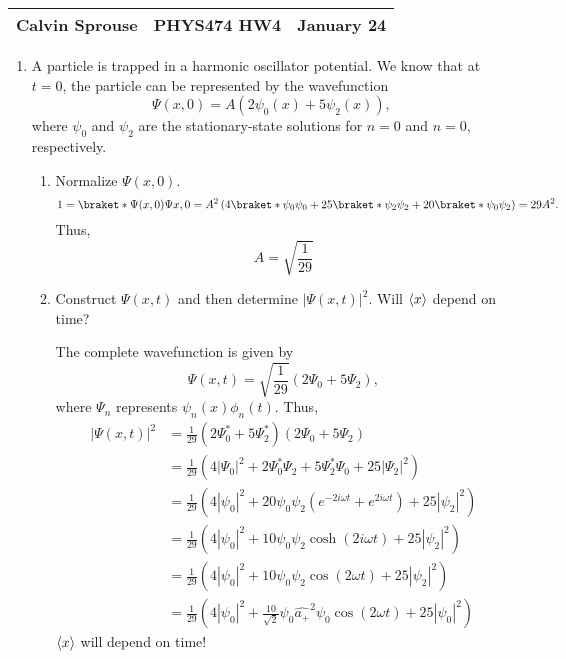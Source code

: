 \documentclass[a4paper, 12pt]{config/homework}
\begin{document}
\noindent
\begin{tabularx}{\textwidth}{>{\centering\arraybackslash}X>{\centering\arraybackslash}X>{\centering\arraybackslash}X}
Calvin Sprouse & PHYS474 HW4 & 2024 January 24\\
\midrule
\end{tabularx}

\begin{enumerate}
\item A particle is trapped in a harmonic oscillator potential. We know that at \(t=0\), the particle can be represented by the wavefunction
\[\Psi(x,0) = A\left(2\psi_0(x) + 5\psi_2(x)\right),\]
where \(\psi_0\) and \(\psi_2\) are the stationary-state solutions for \(n=0\) and \(n=0\), respectively.
\begin{enumerate}[label=(\alph*)]
\item Normalize \(\Psi(x,0)\).
\[1 = \braket*{\Psi(x,0)}{\Psi{x,0}}
= A^2 \left( 4 \braket*{\psi_0}{\psi_0} + 25 \braket*{\psi_2}{\psi_2} + 20\braket*{\psi_0}{\psi_2} \right)
= 29 A^2.\]
Thus,
\[A = \sqrt{\frac{1}{29}}\]

\item Construct \(\Psi(x,t)\) and then determine \(\left|\Psi(x,t)\right|^2\). Will \(\left\langle x \right\rangle\) depend on time?

The complete wavefunction is given by
\[\Psi(x,t) = \sqrt{\frac{1}{29}} \left( 2 \Psi_0 + 5 \Psi_2 \right),\]
where \(\Psi_n\) represents \(\psi_n(x)\phi_n(t)\). Thus,
\begin{align*}
\left| \Psi(x,t) \right|^2 &= \frac{1}{29}\left(2\Psi_0^* + 5\Psi_2^*\right)\left(2\Psi_0 + 5\Psi_2\right)
\\&= \frac{1}{29}\left(4\left|\Psi_0\right|^2 + 2\Psi_0^*\Psi_2 + 5\Psi_2^*\Psi_0 + 25\left|\Psi_2\right|^2\right)
\\&= \frac{1}{29}\left(4\left|\psi_0\right|^2
+ 20\psi_0\psi_2\left(e^{-2i\omega t} + e^{2i\omega t}\right)
+ 25\left|\psi_2\right|^2\right)
\\&= \frac{1}{29}\left(
4\left|\psi_0\right|^2
+ 10 \psi_0 \psi_2 \cosh(2i\omega t)
+ 25 \left|\psi_2\right|^2
\right)
\\&= \frac{1}{29}\left(
4\left|\psi_0\right|^2
+ 10 \psi_0 \psi_2 \cos(2\omega t)
+ 25 \left|\psi_2\right|^2
\right)
\\&= \frac{1}{29}\left(
4\left|\psi_0\right|^2
+ \frac{10}{\sqrt{2}}\psi_0\widehat{a_+}^2\psi_0\cos(2\omega t)
+ 25 \left|\psi_0\right|^2
\right)
\end{align*}
\(\left\langle x \right\rangle\) will depend on time!
\end{enumerate}


\end{enumerate}
\end{document}
